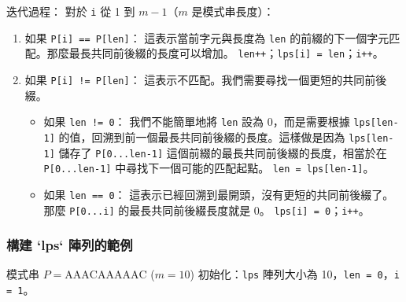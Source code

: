 迭代過程：
對於 \verb|i| 從 1 到 $m-1$（$m$ 是模式串長度）：
\begin{enumerate}
    \item 如果 \verb|P[i] == P[len]|：
    這表示當前字元與長度為 \verb|len| 的前綴的下一個字元匹配。那麼最長共同前後綴的長度可以增加。
    \verb|len++|；\verb|lps[i] = len|；\verb|i++|。
    \item 如果 \verb|P[i] != P[len]|：
    這表示不匹配。我們需要尋找一個更短的共同前後綴。
    \begin{itemize}
        \item 如果 \verb|len != 0|：
            我們不能簡單地將 \verb|len| 設為 0，而是需要根據 \verb|lps[len-1]| 的值，回溯到前一個最長共同前後綴的長度。這樣做是因為 \verb|lps[len-1]| 儲存了 \verb|P[0...len-1]| 這個前綴的最長共同前後綴的長度，相當於在 \verb|P[0...len-1]| 中尋找下一個可能的匹配起點。
            \verb|len = lps[len-1]|。
        \item 如果 \verb|len == 0|：
            這表示已經回溯到最開頭，沒有更短的共同前後綴了。那麼 \verb|P[0...i]| 的最長共同前後綴長度就是 0。
            \verb|lps[i] = 0|；\verb|i++|。
    \end{itemize}
\end{enumerate}

\subsubsection{構建 `lps` 陣列的範例}
模式串 $P = \text{AAACAAAAAC}$ ($m=10$)
初始化：\texttt{lps} 陣列大小為 10，\texttt{len = 0}，\texttt{i = 1}。

